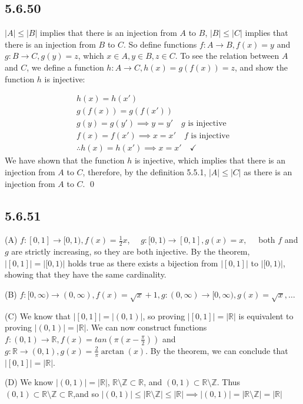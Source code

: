 \documentclass{article}
\begin{document}
\subsection*{5.6.50}

$|A|\leq |B|$ implies that there is an injection from $A$ to $B$,  $|B|\leq |C|$ implies that there is an injection from $B$ to $C$. So define functions $f: A\rightarrow B, f(x)=y$ and $g: B\rightarrow C, g(y)=z$, which $x\in A, y\in B, z\in C$. To see the relation between $A$ and $C$, we define a function $h: A\rightarrow C, h(x)=g(f(x))=z$, and show the function $h$ is injective:

\begin{gather*}
    h(x)=h(x')\\
    g(f(x))=g(f(x'))\\
    g(y)=g(y')\implies y=y' \quad \text{$g$ is injective}\\
    f(x)=f(x')\implies x=x' \quad \text{$f$ is injective}\\
    \therefore h(x)=h(x') \implies x=x' \quad \checkmark
\end{gather*}
We have shown that the function $h$ is injective, which implies that there is an injection from $A$ to $C$, therefore, by the definition 5.5.1, $|A|\leq |C|$ as there is an injection from $A$ to $C$. \qed 


\subsection*{5.6.51}

(A) $f: [0,1]\rightarrow [0,1), f(x)=\frac{1}{2}x$, $\quad g:[0,1)\rightarrow [0,1], g(x)=x,\quad$ both $f$ and $g$ are strictly increasing, so they are both injective. By the theorem,   $|[0,1]|=|[0,1)|$ holds true as there exists a bijection from $|[0,1]|$ to $|[0,1)|$, showing that they have the same cardinality. 

(B)  $f:[0,\infty)\rightarrow(0,\infty), f(x)=\sqrt{x}+1, g:(0,\infty)\rightarrow[0,\infty), g(x)=\sqrt{x},\ldots$ 

(C) We know that $|[0,1]|=|(0,1)|$, so proving $|[0,1]|=|\mathbb{R}|$ is equivalent to proving $|(0,1)|=|\mathbb{R}|$.  We can now construct functions $f:(0,1)\rightarrow \mathbb{R}, f(x)=tan(\pi(x-\frac\pi2))$ and $g:\mathbb{R}\rightarrow (0,1), g(x)=\frac{2}{\pi}\arctan\left(x\right)$. By the theorem, we can conclude that $|[0,1]|=|\mathbb{R}|$.

(D) We know $|(0,1)|=|\mathbb{R}|$, $\mathbb{R}\setminus\mathbb{Z}\subset\mathbb{R}$, and $(0,1)\subset \mathbb{R}\setminus\mathbb{Z}$. Thus $(0,1)\subset\mathbb{R}\setminus\mathbb{Z}\subset\mathbb{R}$,and so $|(0,1)|\leq|\mathbb{R}\setminus\mathbb{Z}|\leq|\mathbb{R}|\implies |(0,1)|=|\mathbb{R}\setminus\mathbb{Z}|=|\mathbb{R}|$ 
\end{document}
